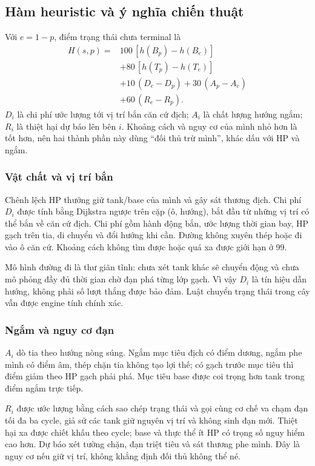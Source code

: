 \subsection{Hàm heuristic và ý nghĩa chiến thuật}
Với $e=1-p$, điểm trạng thái chưa terminal là
\begin{equation}
\begin{split}
H(s,p)={}&100\,[h(B_p)-h(B_e)]\\
&+80\,[h(T_p)-h(T_e)]\\
&+10\,(D_e-D_p)+30\,(A_p-A_e)\\
&+60\,(R_e-R_p).
\end{split}
\label{t2:eq:heuristic}
\end{equation}
$D_i$ là chi phí ước lượng tới vị trí bắn căn cứ địch; $A_i$ là chất
lượng hướng ngắm; $R_i$ là thiệt hại dự báo lên bên $i$. Khoảng cách
và nguy cơ của mình nhỏ hơn là tốt hơn, nên hai thành phần này dùng
``đối thủ trừ mình'', khác dấu với HP và ngắm.

\subsubsection{Vật chất và vị trí bắn}
Chênh lệch HP thưởng giữ tank/base của mình và gây sát thương địch.
Chi phí $D_i$ được tính bằng Dijkstra ngược trên cặp (ô, hướng), bắt
đầu từ những vị trí có thể bắn về căn cứ địch. Chi phí gồm hành động
bắn, ước lượng thời gian bay, HP gạch trên tia, di chuyển và đổi hướng
khi cần. Đường không xuyên thép hoặc đi vào ô căn cứ. Khoảng cách
không tìm được hoặc quá xa được giới hạn ở 99.

Mô hình đường đi là thư giãn tĩnh: chưa xét tank khác sẽ chuyển động
và chưa mô phỏng đầy đủ thời gian chờ đạn phá từng lớp gạch. Vì vậy
$D_i$ là tín hiệu dẫn hướng, không phải số lượt thắng được bảo đảm.
Luật chuyển trạng thái trong cây vẫn được engine tính chính xác.

\subsubsection{Ngắm và nguy cơ đạn}
$A_i$ dò tia theo hướng nòng súng. Ngắm mục tiêu địch có điểm dương,
ngắm phe mình có điểm âm, thép chặn tia không tạo lợi thế; có gạch
trước mục tiêu thì điểm giảm theo HP gạch phải phá. Mục tiêu base
được coi trọng hơn tank trong điểm ngắm trực tiếp.

$R_i$ được ước lượng bằng cách sao chép trạng thái và gọi cùng cơ
chế va chạm đạn tối đa ba cycle, giả sử các tank giữ nguyên vị trí và
không sinh đạn mới. Thiệt hại xa được chiết khấu theo cycle; base và
thực thể ít HP có trọng số nguy hiểm cao hơn. Dự báo xét tường chặn,
đạn triệt tiêu và sát thương phe mình. Đây là nguy cơ nếu giữ vị trí,
không khẳng định đối thủ không thể né.

